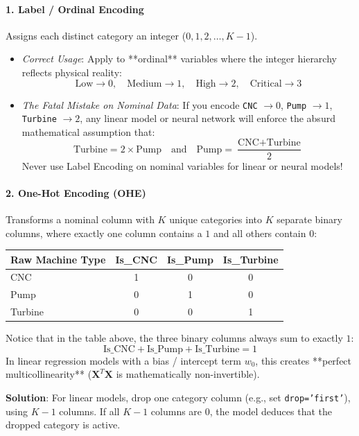 \paragraph{1. Label / Ordinal Encoding}
Assigns each distinct category an integer ($0, 1, 2, \dots, K-1$).
\begin{itemize}
    \item \textit{Correct Usage}: Apply to **ordinal** variables where the integer hierarchy reflects physical reality:
    \begin{equation*}
    \text{Low} \to 0, \quad \text{Medium} \to 1, \quad \text{High} \to 2, \quad \text{Critical} \to 3
    \end{equation*}
    \item \textit{The Fatal Mistake on Nominal Data}: If you encode \texttt{CNC} $\to 0$, \texttt{Pump} $\to 1$, \texttt{Turbine} $\to 2$, any linear model or neural network will enforce the absurd mathematical assumption that:
    \begin{equation*}
    \text{Turbine} = 2 \times \text{Pump} \quad \text{and} \quad \text{Pump} = \frac{\text{CNC} + \text{Turbine}}{2}
    \end{equation*}
    Never use Label Encoding on nominal variables for linear or neural models!
\end{itemize}

\paragraph{2. One-Hot Encoding (OHE)}
Transforms a nominal column with $K$ unique categories into $K$ separate binary columns, where exactly one column contains a $1$ and all others contain $0$:
\begin{center}
\small
\begin{tabular}{lccc}
\toprule
\textbf{Raw Machine Type} & \textbf{Is\_CNC} & \textbf{Is\_Pump} & \textbf{Is\_Turbine} \\
\midrule
CNC & 1 & 0 & 0 \\
Pump & 0 & 1 & 0 \\
Turbine & 0 & 0 & 1 \\
\bottomrule
\end{tabular}
\end{center}

\begin{keyidea}
Notice that in the table above, the three binary columns always sum to exactly $1$:
\begin{equation}
\text{Is\_CNC} + \text{Is\_Pump} + \text{Is\_Turbine} = 1
\end{equation}
In linear regression models with a bias / intercept term $w_0$, this creates **perfect multicollinearity** ($\mathbf{X}^T \mathbf{X}$ is mathematically non-invertible). 

\textbf{Solution}: For linear models, drop one category column (e.g., set \texttt{drop='first'}), using $K - 1$ columns. If all $K - 1$ columns are $0$, the model deduces that the dropped category is active.
\end{keyidea}


